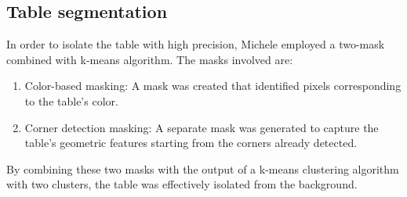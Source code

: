 \subsection{Table segmentation}

In order to isolate the table with high precision, Michele employed a two-mask combined with k-means algorithm.  The masks involved are:
\begin{enumerate}
	\item Color-based masking: A mask was created that identified pixels corresponding to the table's color.
	\item Corner detection masking: A separate mask was generated to capture the table's geometric features starting from the corners already detected.
\end{enumerate}
By combining these two masks with the output of a k-means clustering algorithm with two clusters, the table was effectively isolated from the background.